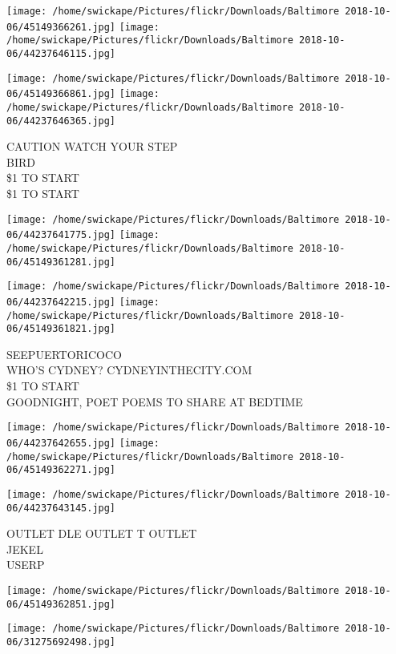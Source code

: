 \documentclass[10pt,letterpaper]{article}
\begin{document}
\texttt{[image: /home/swickape/Pictures/flickr/Downloads/Baltimore 2018-10-06/45149366261.jpg]}
\texttt{[image: /home/swickape/Pictures/flickr/Downloads/Baltimore 2018-10-06/44237646115.jpg]}

\texttt{[image: /home/swickape/Pictures/flickr/Downloads/Baltimore 2018-10-06/45149366861.jpg]}
\texttt{[image: /home/swickape/Pictures/flickr/Downloads/Baltimore 2018-10-06/44237646365.jpg]}

CAUTION WATCH YOUR STEP\\
BIRD\\
\$1 TO START\\
\$1 TO START\\
\pagebreak

\texttt{[image: /home/swickape/Pictures/flickr/Downloads/Baltimore 2018-10-06/44237641775.jpg]}
\texttt{[image: /home/swickape/Pictures/flickr/Downloads/Baltimore 2018-10-06/45149361281.jpg]}

\texttt{[image: /home/swickape/Pictures/flickr/Downloads/Baltimore 2018-10-06/44237642215.jpg]}
\texttt{[image: /home/swickape/Pictures/flickr/Downloads/Baltimore 2018-10-06/45149361821.jpg]}

SEEPUERTORICOCO\\
WHO'S CYDNEY?  CYDNEYINTHECITY.COM\\
\$1 TO START\\
GOODNIGHT, POET POEMS TO SHARE AT BEDTIME\\
\pagebreak

\texttt{[image: /home/swickape/Pictures/flickr/Downloads/Baltimore 2018-10-06/44237642655.jpg]}
\texttt{[image: /home/swickape/Pictures/flickr/Downloads/Baltimore 2018-10-06/45149362271.jpg]}

\texttt{[image: /home/swickape/Pictures/flickr/Downloads/Baltimore 2018-10-06/44237643145.jpg]}

OUTLET DLE OUTLET T OUTLET\\
JEKEL\\
USERP\\
\pagebreak

\texttt{[image: /home/swickape/Pictures/flickr/Downloads/Baltimore 2018-10-06/45149362851.jpg]}

\vspace{0.25in}
\texttt{[image: /home/swickape/Pictures/flickr/Downloads/Baltimore 2018-10-06/31275692498.jpg]}
\end{document}
